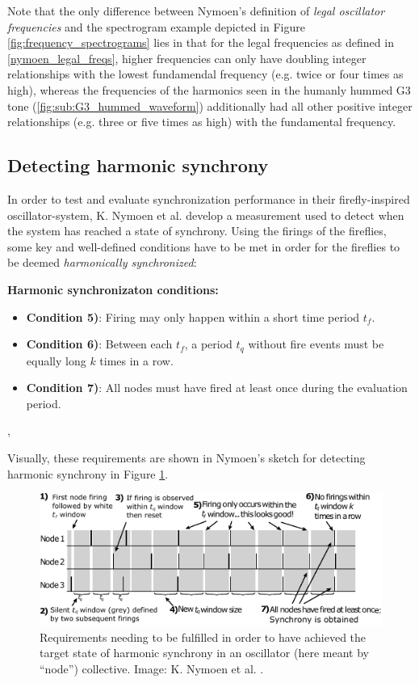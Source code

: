Note that the only difference between Nymoen's definition of \textit{legal oscillator frequencies} and the spectrogram example depicted in Figure \ref{fig:frequency_spectrograms} lies in that for the legal frequencies as defined in \eqref{nymoen_legal_freqs}, higher frequencies can only have doubling integer relationships with the lowest fundamendal frequency (e.g. twice or four times as high), whereas the frequencies of the harmonics seen in the humanly hummed G3 tone (\ref{fig:sub:G3_hummed_waveform}) additionally had all other positive integer relationships (e.g. three or five times as high) with the fundamental frequency.

	\subsection{Detecting harmonic synchrony}
	\label{baseline:subsec:detecting_harmonic_sync}
	In order to test and evaluate synchronization performance in their firefly-inspired oscillator-system, K. Nymoen et al. \cite{nymoen_synch} develop a measurement used to detect when the system has reached a state of synchrony. Using the firings of the fireflies, some key and well-defined conditions have to be met in order for the fireflies to be deemed \textit{harmonically synchronized}: \nl
	
	\textbf{Harmonic synchronizaton conditions:}
	
	\begin{itemize}
		\item[] \textbf{Condition 5)}: Firing may only happen within a short time period $t_f$.
		\item[] \textbf{Condition 6)}: Between each $t_f$, a period $t_q$ without fire events must be equally long $k$ times in a row.
		\item[] \textbf{Condition 7)}: All nodes must have fired at least once during the evaluation period.
	\end{itemize}
	\sep
	
	Visually, these requirements are shown in Nymoen's sketch for detecting harmonic synchrony in Figure \ref{fig:nymoen_harm_sync_detect}.
	
	\begin{figure}[ht!]
		\centering
		\includegraphics[width=\linewidth]{Assets/DocSegments/Chapters/Baseline/Figures/Illustrations/NymoenHarmonicSyncDetectionSchema.pdf}
		\caption[Nymoen et al.'s harmonic synchrony detection schema.]{Requirements needing to be fulfilled in order to have achieved the target state of harmonic synchrony in an oscillator (here meant by ``node'') collective. Image: K. Nymoen et al. \cite{nymoen_synch}.}
		\label{fig:nymoen_harm_sync_detect}
	\end{figure}
	
